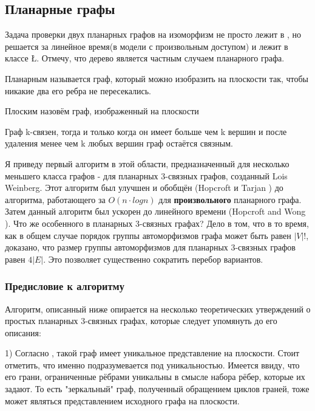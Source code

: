 \subsection{Планарные графы}
Задача проверки двух планарных графов на изоморфизм не просто лежит в \poly, но решается за линейное время(в модели с произвольным доступом) \cite{1} и лежит в классе \L\cite{2}. Отмечу, что дерево является частным случаем планарного графа.
\begin{definition}
    Планарным называется граф, который можно изобразить на плоскости так, чтобы никакие два его ребра не пересекались.
\end{definition}
\begin{definition}
    Плоским назовём граф, изображенный на плоскости
\end{definition}
\begin{definition}
    Граф k-связен, тогда и только когда он имеет больше чем k вершин и после удаления менее чем k любых вершин граф остаётся связным. 
\end{definition}
Я приведу первый алгоритм в этой области, предназначенный для несколько меньшего класса графов - для планарных 3-связных графов\cite{3}, созданный Lois Weinberg. Этот алгоритм был улучшен и обобщён (Hopcroft и Tarjan \cite{6}) до алгоритма, работающего за $O(n \cdot logn)$ для \textbf{произвольного} планарного графа. Затем данный алгоритм был ускорен до линейного времени (Hopcroft and Wong \cite{1}).
Что же особенного в планарных 3-связных графах? Дело в том, что в то время, как в общем случае порядок группы автоморфизмов графа может быть равен $|V|!$, доказано\cite{4}, что размер группы автоморфизмов для планарных 3-связных графов равен $4|E|$. Это позволяет существенно сократить перебор вариантов.
\subsubsection*{Предисловие к алгоритму}
Алгоритм, описанный ниже опирается на несколько теоретических утверждений о простых планарных 3-связных графах, которые следует упомянуть до его описания:

1) Согласно \cite{5}, такой граф имеет уникальное представление на плоскости. Стоит отметить, что именно подразумевается под уникальностью. Имеется ввиду, что его грани, ограниченные рёбрами уникальны в смысле набора рёбер, которые их задают. То есть "зеркальный" граф, полученный обращением циклов граней, тоже может являться представлением исходного графа на плоскости.

